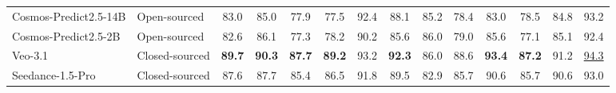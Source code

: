 \begin{table}[H]
\begin{tabular}{l l c cccc | ccccccc}
      Cosmos-Predict2.5-14B & Open-sourced & 83.0 & 85.0 & 77.9 & 77.5 & 92.4 & 88.1 & 85.2 & 78.4 & 83.0 & 78.5 & 84.8 & 93.2 \\
      Cosmos-Predict2.5-2B & Open-sourced & 82.6 & 86.1 & 77.3 & 78.2 & 90.2 & 85.6 & 86.0 & 79.0 & 85.6 & 77.1 & 85.1 & 92.4 \\
      \midrule
      Veo-3.1 & Closed-sourced & \textbf{89.7} & \textbf{90.3} & \textbf{87.7} & \textbf{89.2} & 93.2 & \textbf{92.3} & 86.0 & 88.6 & \textbf{93.4} & \textbf{87.2} & 91.2 &
\underline{94.3} \\
      Seedance-1.5-Pro & Closed-sourced & 87.6 & 87.7 & 85.4 & 86.5 & 91.8 & 89.5 & 82.9 & 85.7 & 90.6 & 85.7 & 90.6 & 93.0 \\
      \bottomrule
  \end{tabular}
\end{table}
